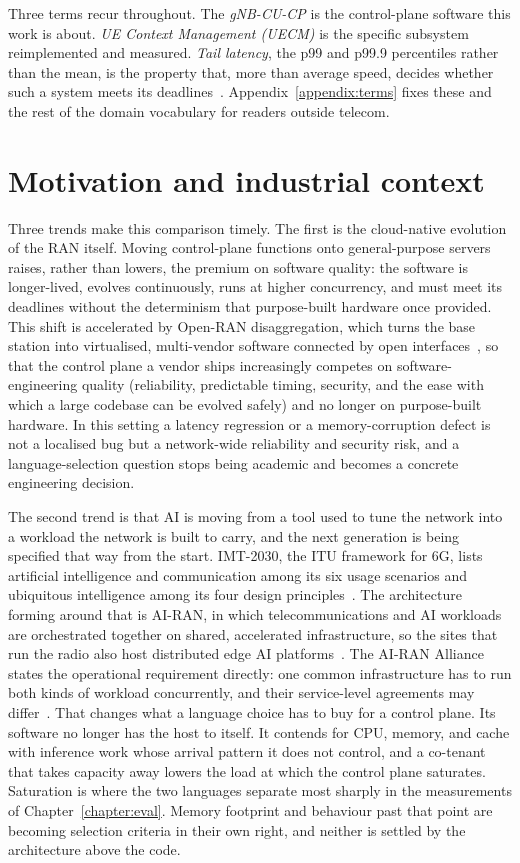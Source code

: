 \documentclass[english,twoside,openright,a4paper,censored,csm,software-track-2020]{HYthesisML}
\begin{document}
Three terms recur throughout. The \emph{gNB-CU-CP} is the control-plane software this work is
about. \emph{UE Context Management (UECM)} is the specific subsystem reimplemented and measured.
\emph{Tail latency}, the p99 and p99.9 percentiles rather than the mean, is the property that,
more than average speed, decides whether such a system meets its
deadlines~\cite{dean2013tail,barroso2017microseconds}. Appendix~\ref{appendix:terms} fixes these
and the rest of the domain vocabulary for readers outside telecom.

\section{Motivation and industrial context}\label{sec:motivation}
Three trends make this comparison timely. The first is the cloud-native evolution of the RAN
itself. Moving control-plane functions onto general-purpose servers raises, rather than
lowers, the premium on software quality: the software is longer-lived, evolves continuously,
runs at higher concurrency, and must meet its deadlines without the determinism that
purpose-built hardware once provided. This shift is accelerated by Open-RAN disaggregation,
which turns the base station into virtualised, multi-vendor software connected by open
interfaces~\cite{polese2023oran}, so that the control plane a vendor ships increasingly
competes on software-engineering quality (reliability, predictable timing, security, and the
ease with which a large codebase can be evolved safely) and no longer on purpose-built hardware. In
this setting a latency regression or a memory-corruption defect is not a localised bug but a
network-wide reliability and security risk, and a language-selection question stops being
academic and becomes a concrete engineering decision.

The second trend is that AI is moving from a tool used to tune the network into a workload the
network is built to carry, and the next generation is being specified that way from the start.
IMT-2030, the ITU framework for 6G, lists artificial intelligence and communication among its
six usage scenarios and ubiquitous intelligence among its four design
principles~\cite{itu2023imt2030}. The architecture forming around that is AI-RAN, in which
telecommunications and AI workloads are orchestrated together on shared, accelerated
infrastructure, so the sites that run the radio also host distributed edge AI
platforms~\cite{polese2026airan}. The AI-RAN Alliance states the operational requirement
directly: one common infrastructure has to run both kinds of workload concurrently, and their
service-level agreements may differ~\cite{airan2025orchestrator}. That changes what a language
choice has to buy for a control plane. Its software no longer has the host to itself. It
contends for CPU, memory, and cache with inference work whose arrival pattern it does not
control, and a co-tenant that takes capacity away lowers the load at which the control plane
saturates. Saturation is where the two languages separate most sharply in the measurements of
Chapter~\ref{chapter:eval}. Memory footprint and behaviour past that point are becoming
selection criteria in their own right, and neither is settled by the architecture above the
code.
\end{document}
